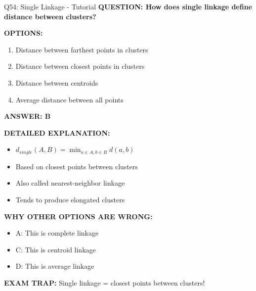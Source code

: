 \documentclass[8pt]{beamer}
\begin{document}
	\begin{frame}{Q54: Single Linkage - Tutorial}
		\fontsize{6.5}{7.5}\selectfont
		\textbf{QUESTION: How does single linkage define distance between clusters?}
		
		\vspace{0.1cm}
		\textbf{OPTIONS:}
		\begin{enumerate}
			\item Distance between farthest points in clusters
			\item Distance between closest points in clusters
			\item Distance between centroids
			\item Average distance between all points
		\end{enumerate}
		
		\vspace{0.1cm}
		\textcolor{myblue}{\textbf{ANSWER: B}}
		
		\vspace{0.1cm}
		\textbf{DETAILED EXPLANATION:}
		\begin{itemize}
			\item $d_{single}(A,B) = \min_{a \in A, b \in B} d(a,b)$
			\item Based on closest points between clusters
			\item Also called nearest-neighbor linkage
			\item Tends to produce elongated clusters
		\end{itemize}
		
		\vspace{0.1cm}
		\textcolor{myred}{\textbf{WHY OTHER OPTIONS ARE WRONG:}}
		\begin{itemize}
			\item \textcolor{myred}{A:} This is complete linkage
			\item \textcolor{myred}{C:} This is centroid linkage
			\item \textcolor{myred}{D:} This is average linkage
		\end{itemize}
		
		\textcolor{myred}{\textbf{EXAM TRAP:}} Single linkage = \textcolor{myblue}{closest points between clusters}!
	\end{frame}
	
\end{document}
